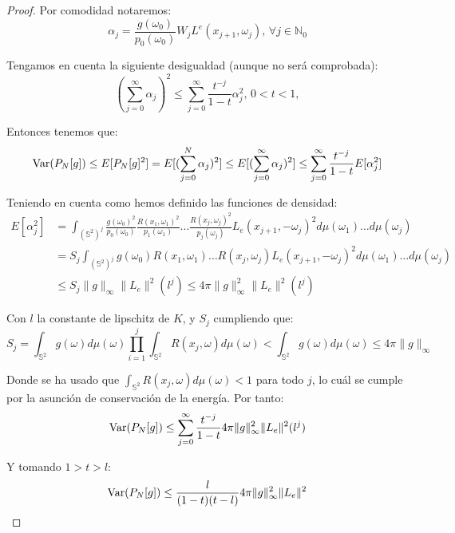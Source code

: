 \begin{proof}
  Por comodidad notaremos:
  $$\alpha_j = \frac{g(\omega_0)}{p_0(\omega_0)}W_jL^e(x_{j+1},\omega_j)\text{, }\forall j\in \mathds{N}_0$$

  Tengamos en cuenta la siguiente desigualdad (aunque no será comprobada):
$$(\sum_{j=0}^{\infty}\alpha_j)^2\leq \sum_{j=0}^{\infty}\frac{t^{-j}}{1-t}\alpha_j^2 \text{, } 0<t<1,$$

  Entonces tenemos que:
$$ \mathrm{Var}(P_N[g])\leq E[P_N[g]^2]=E[(\sum_{j=0}^{N}\alpha_j)^2]\leq E[(\sum_{j=0}^{\infty}\alpha_j)^2]\leq\sum_{j=0}^{\infty}\frac{t^{-j}}{1-t}E[\alpha_j^2]$$

  Teniendo en cuenta como hemos definido las funciones de densidad:
  \begin{align*}
    E[\alpha_j^2] &= \int_{(\mathds{S}^2)^j} \frac{g(\omega_0)^2}{p_0(\omega_0)}\frac{R(x_1,\omega_1)^2}{p_1(\omega_1)}\ldots\frac{R(x_j,\omega_j)^2}{p_j(\omega_j)}L_e(x_{j+1},-\omega_j)^2d\mu(\omega_1)\ldots d\mu(\omega_j)\\
    &=S_j \int_{(\mathds{S}^2)^j} g(\omega_0)R(x_1,\omega_1)\ldots R(x_j,\omega_j)L_e(x_{j+1},-\omega_j)^2d\mu(\omega_1)\ldots d\mu(\omega_j)\\
    &\leq S_j \|g\|_{\infty} \|L_e\|^2 (l^j)\leq 4\pi \|g\|_{\infty}^2\|L_e\|^2 (l^j)
  \end{align*}

  Con $l$ la constante de lipschitz de $K$, y $S_j$ cumpliendo que: 
  $$S_j=\int_{\mathds{S}^2}g(\omega)d\mu(\omega) \prod_{i=1}^j\int_{\mathds{S}^2}R(x_j, \omega)d\mu(\omega)< \int_{\mathds{S}^2}g(\omega)d\mu(\omega) \leq 4\pi \|g\|_{\infty}$$

  Donde se ha usado que $\int_{\mathds{S}^2}R(x_j, \omega)d\mu(\omega)<1$ para todo $j$, lo cuál se cumple por la asunción de conservación de la energía. Por tanto:
  $$\mathrm{Var}(P_N[g])\leq \sum_{j=0}^{\infty}\frac{t^{-j}}{1-t} 4\pi \|g\|_{\infty}^2 \|L_e\|^2 (l^j)$$

  Y tomando $1>t>l$:
  $$\mathrm{Var}(P_N[g])\leq \frac{l}{(1-t)(t-l)} 4\pi \|g\|_{\infty}^2 \|L_e\|^2$$
  \end{proof}


